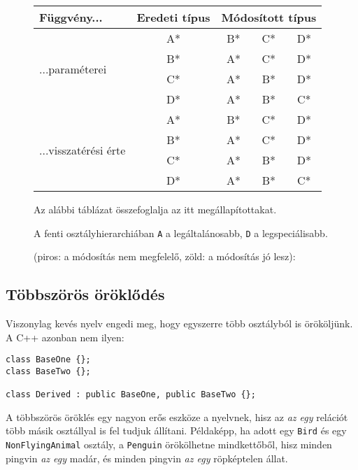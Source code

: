 \documentclass[../cpp_book/cpp_book.tex]{subfiles}
\begin{document}
	\begin{figure}
		\centering
		\medskip
		
		\setlength{\extrarowheight}{2pt}
		\begin{tabular}{|l||c|c|c|c|}
			\hline
			Függvény...&Eredeti típus&\multicolumn{3}{c|}{Módosított típus}\\
			\hline
			\hline
			\multirow{4}{*}{...paraméterei}&A*&\cellcolor{red!20}B*&\cellcolor{red!20}C*&\cellcolor{red!20}D*\\
			\cline{2-5}
			&B*&\cellcolor{green!20}A*&\cellcolor{red!20}C*&\cellcolor{red!20}D*\\
			\cline{2-5}
			&C*&\cellcolor{green!20}A*&\cellcolor{green!20}B*&\cellcolor{red!20}D*\\
			\cline{2-5}
			&D*&\cellcolor{green!20}A*&\cellcolor{green!20}B*&\cellcolor{green!20}C*\\
			\hline
			\hline
			\multirow{4}{*}{...visszatérési érte}&A*&\cellcolor{green!20}B*&\cellcolor{green!20}C*&\cellcolor{green!20}D*\\
			\cline{2-5}
			&B*&\cellcolor{red!20}A*&\cellcolor{green!20}C*&\cellcolor{green!20}D*\\
			\cline{2-5}
			&C*&\cellcolor{red!20}A*&\cellcolor{red!20}B*&\cellcolor{green!20}D*\\
			\cline{2-5}
			&D*&\cellcolor{red!20}A*&\cellcolor{red!20}B*&\cellcolor{red!20}C*\\
			\hline
		\end{tabular}
		\smallskip
	
		Az alábbi táblázat összefoglalja az itt megállapítottakat.
		
		A fenti osztályhierarchiában \texttt{A} a legáltalánosabb, \texttt{D} a legspeciálisabb.
		
		(piros: a módosítás nem megfelelő, zöld: a módosítás jó lesz):
	\end{figure}
	\subsection{Többszörös öröklődés}
	Viszonylag kevés nyelv engedi meg, hogy egyszerre több osztályból is örököljünk. A C++ azonban nem ilyen:
	\begin{lstlisting}
class BaseOne {};
class BaseTwo {};

class Derived : public BaseOne, public BaseTwo {};
	\end{lstlisting}
	A többszörös öröklés egy nagyon erős eszköze a nyelvnek, hisz az \textit{az egy} relációt több másik osztállyal is fel tudjuk állítani. Példaképp, ha adott egy \texttt{Bird} és egy \texttt{NonFlyingAnimal} osztály, a \texttt{Penguin} örökölhetne mindkettőből, hisz minden pingvin \textit{az egy} madár, és minden pingvin \textit{az egy} röpképtelen állat.
	
\end{document}
